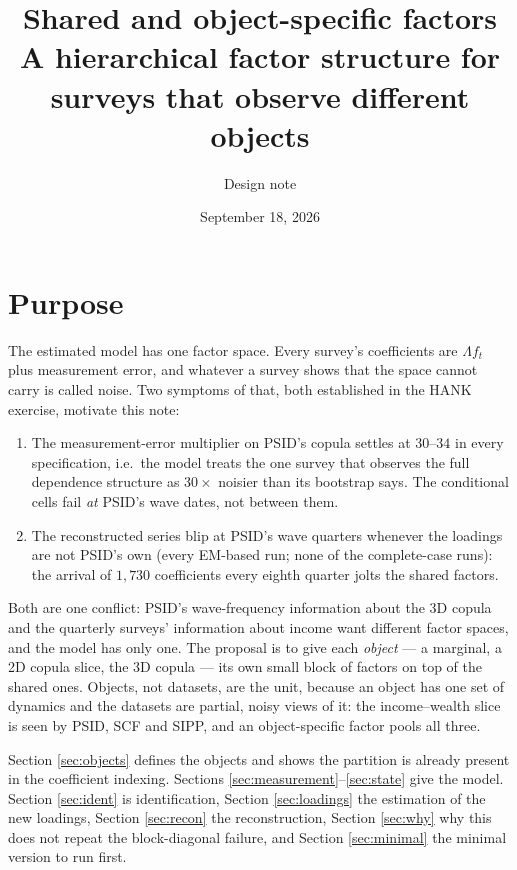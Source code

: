 \documentclass[11pt]{article}
\title{Shared and object-specific factors\\
\large A hierarchical factor structure for surveys that observe different objects}
\author{Design note}
\date{September 18, 2026}
\begin{document}
\maketitle

\section{Purpose}\label{sec:purpose}

The estimated model has one factor space. Every survey's coefficients are
$\Lambda f_t$ plus measurement error, and whatever a survey shows that the space
cannot carry is called noise. Two symptoms of that, both established in the
HANK exercise, motivate this note:
\begin{enumerate}[leftmargin=*]
  \item The measurement-error multiplier on PSID's copula settles at $30$--$34$
        in every specification, i.e.\ the model treats the one survey that
        observes the full dependence structure as $30\times$ noisier than its
        bootstrap says. The conditional cells fail \emph{at} PSID's wave dates,
        not between them.
  \item The reconstructed series blip at PSID's wave quarters whenever the
        loadings are not PSID's own (every EM-based run; none of the
        complete-case runs): the arrival of $1{,}730$ coefficients every eighth
        quarter jolts the shared factors.
\end{enumerate}
Both are one conflict: PSID's wave-frequency information about the 3D copula
and the quarterly surveys' information about income want different factor
spaces, and the model has only one. The proposal is to give each \emph{object}
--- a marginal, a 2D copula slice, the 3D copula --- its own small block of
factors on top of the shared ones. Objects, not datasets, are the unit, because
an object has one set of dynamics and the datasets are partial, noisy views of
it: the income--wealth slice is seen by PSID, SCF and SIPP, and an
object-specific factor pools all three.

Section \ref{sec:objects} defines the objects and shows the partition is
already present in the coefficient indexing. Sections
\ref{sec:measurement}--\ref{sec:state} give the model. Section
\ref{sec:ident} is identification, Section \ref{sec:loadings} the estimation of
the new loadings, Section \ref{sec:recon} the reconstruction, Section
\ref{sec:why} why this does not repeat the block-diagonal failure, and Section
\ref{sec:minimal} the minimal version to run first.
\end{document}
